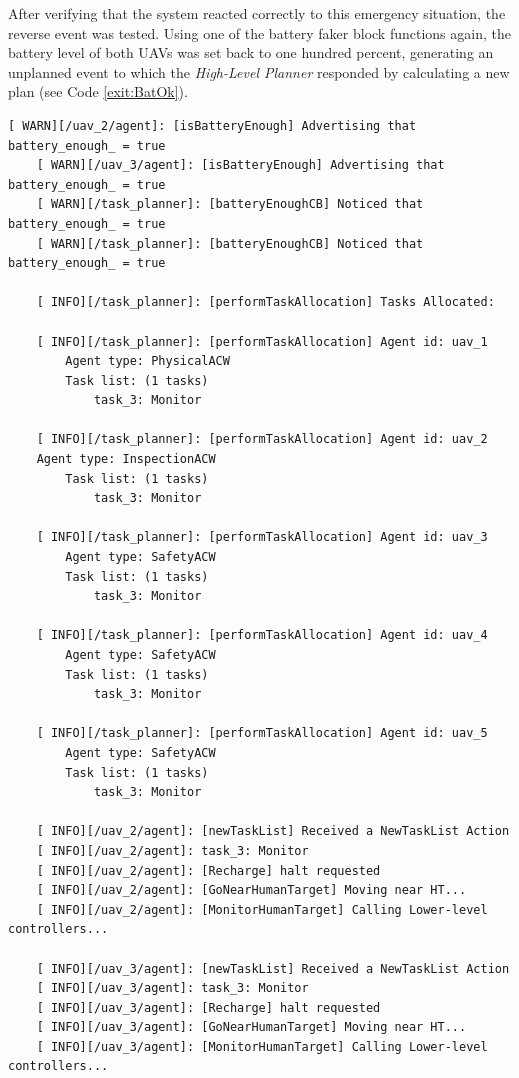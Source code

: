 After verifying that the system reacted correctly to this emergency situation, the reverse event was tested. Using one of the battery faker block functions again, the battery level of both \glspl{UAV} was set back to one hundred percent, generating an unplanned event to which the \emph{High-Level Planner} responded by calculating a new plan (see Code \ref{exit:BatOk}).

\begin{lstlisting}[caption={Feedback messages printed after the battery of two UAVs is fully charged}, breaklines=true, label=exit:BatOk]
    [ WARN][/uav_2/agent]: [isBatteryEnough] Advertising that battery_enough_ = true
    [ WARN][/uav_3/agent]: [isBatteryEnough] Advertising that battery_enough_ = true
    [ WARN][/task_planner]: [batteryEnoughCB] Noticed that battery_enough_ = true
    [ WARN][/task_planner]: [batteryEnoughCB] Noticed that battery_enough_ = true
    
    [ INFO][/task_planner]: [performTaskAllocation] Tasks Allocated:
    
    [ INFO][/task_planner]: [performTaskAllocation] Agent id: uav_1
        Agent type: PhysicalACW
        Task list: (1 tasks)
            task_3: Monitor
    
    [ INFO][/task_planner]: [performTaskAllocation] Agent id: uav_2
    Agent type: InspectionACW
        Task list: (1 tasks)
            task_3: Monitor
    
    [ INFO][/task_planner]: [performTaskAllocation] Agent id: uav_3
        Agent type: SafetyACW
        Task list: (1 tasks)
            task_3: Monitor
    
    [ INFO][/task_planner]: [performTaskAllocation] Agent id: uav_4
        Agent type: SafetyACW
        Task list: (1 tasks)
            task_3: Monitor
    
    [ INFO][/task_planner]: [performTaskAllocation] Agent id: uav_5
        Agent type: SafetyACW
        Task list: (1 tasks)
            task_3: Monitor
    
    [ INFO][/uav_2/agent]: [newTaskList] Received a NewTaskList Action
    [ INFO][/uav_2/agent]: task_3: Monitor
    [ INFO][/uav_2/agent]: [Recharge] halt requested
    [ INFO][/uav_2/agent]: [GoNearHumanTarget] Moving near HT...
    [ INFO][/uav_2/agent]: [MonitorHumanTarget] Calling Lower-level controllers...
    
    [ INFO][/uav_3/agent]: [newTaskList] Received a NewTaskList Action
    [ INFO][/uav_3/agent]: task_3: Monitor
    [ INFO][/uav_3/agent]: [Recharge] halt requested
    [ INFO][/uav_3/agent]: [GoNearHumanTarget] Moving near HT...
    [ INFO][/uav_3/agent]: [MonitorHumanTarget] Calling Lower-level controllers...
\end{lstlisting}

